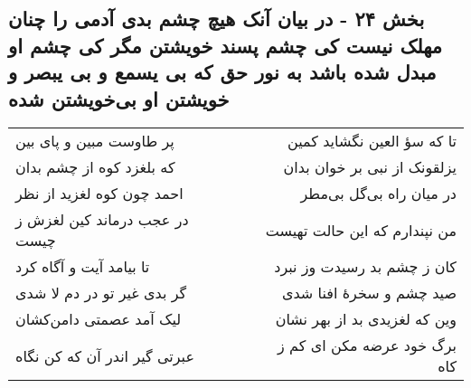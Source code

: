 \begin{center}
\section*{بخش ۲۴ - در بیان آنک هیچ چشم بدی آدمی را چنان مهلک نیست کی چشم پسند  خویشتن مگر کی چشم او مبدل شده باشد به نور حق که بی یسمع و بی یبصر و خویشتن او بی‌خویشتن شده}
\label{sec:sh024}
\begin{longtable}{l p{0.5cm} r}
پر طاوست مبین و پای بین
&&
تا که سؤ العین نگشاید کمین
\\
که بلغزد کوه از چشم بدان
&&
یزلقونک از نبی بر خوان بدان
\\
احمد چون کوه لغزید از نظر
&&
در میان راه بی‌گل بی‌مطر
\\
در عجب درماند کین لغزش ز چیست
&&
من نپندارم که این حالت تهیست
\\
تا بیامد آیت و آگاه کرد
&&
کان ز چشم بد رسیدت وز نبرد
\\
گر بدی غیر تو در دم لا شدی
&&
صید چشم و سخرهٔ افنا شدی
\\
لیک آمد عصمتی دامن‌کشان
&&
وین که لغزیدی بد از بهر نشان
\\
عبرتی گیر اندر آن که کن نگاه
&&
برگ خود عرضه مکن ای کم ز کاه
\\
\end{longtable}
\end{center}
